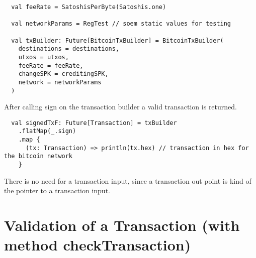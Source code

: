 \begin{lstlisting}
  val feeRate = SatoshisPerByte(Satoshis.one)

  val networkParams = RegTest // soem static values for testing

  val txBuilder: Future[BitcoinTxBuilder] = BitcoinTxBuilder(
    destinations = destinations,
    utxos = utxos,
    feeRate = feeRate,
    changeSPK = creditingSPK,
    network = networkParams
  )
\end{lstlisting}
After calling sign on the transaction builder a valid transaction is returned.
\begin{lstlisting}
  val signedTxF: Future[Transaction] = txBuilder
    .flatMap(_.sign)
    .map {
      (tx: Transaction) => println(tx.hex) // transaction in hex for the bitcoin network
    }
\end{lstlisting}
There is no need for a transaction input, since a transaction out point is kind of the pointer to a transaction input.

\section{Validation of a Transaction (with method checkTransaction)}
